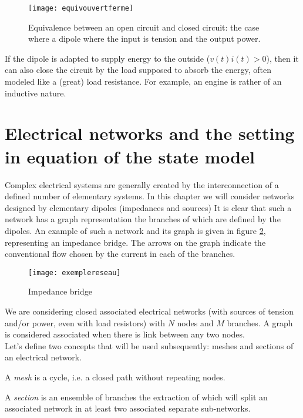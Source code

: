 \begin{figure}[htbp]
\begin{center}
\texttt{[image: equivouvertferme]}
\caption{Equivalence between an open circuit and closed circuit:  the case where a dipole where the input is tension and the output power.}
\label{fig:equivouvertferme}
\end{center}
\end{figure}

If the dipole is adapted to supply energy to the outside ($v(t) i(t) >0$), then it can also close the circuit by the load supposed to absorb the energy, often modeled like a (great) load resistance.  For example, an engine is rather of an inductive nature.

\section{Electrical networks and the setting in equation of the state model}

Complex electrical systems are generally created by the interconnection of a defined number of elementary systems.  In this chapter we will consider networks designed by elementary dipoles (impedances and sources)  It is clear that such a network has a graph representation the branches of which are defined by the dipoles.  An example of such a network and its graph is given in figure \ref{fig:exemplereseau}, representing an impedance bridge.  The arrows on the graph indicate the conventional flow chosen by the current in each of the branches.  

\begin{figure}[t]
\begin{center}
\texttt{[image: exemplereseau]}
\caption{Impedance bridge}
\label{fig:exemplereseau}
\end{center}
\end{figure}
We are considering closed associated electrical networks (with sources of tension and/or power, even with load resistors) with $N$ nodes and $M$ branches.  A graph is considered associated when there is link between any two nodes.\\

Let’s define two concepts that will be used subsequently:  meshes and sections of an electrical network.

\begin{description}
\item A {\em mesh} is a cycle, i.e. a closed path without repeating nodes.
\item A {\em section} is an ensemble of branches the extraction of which will split an associated network in at least two associated separate sub-networks.
\end{description}

